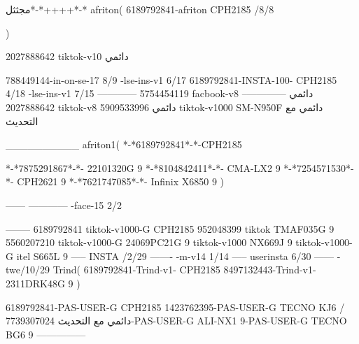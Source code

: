 مجثثل*-*++++*-*
afriton(
6189792841-afriton CPH2185  /8/8

)

2027888642 tiktok-v10
دائمي

788449144-in-on-se-17 8/9
-lse-ins-v1 6/17
6189792841-INSTA-100- CPH2185 4/18
-lse-ins-v1 7/15
------------
5754454119 facbook-v8
دائمي
--------------
2027888642 tiktok-v8
دائمي
5909533996 tiktok-v1000  SM-N950F
دائمي مع التحديث

__________
afriton1(
*-*6189792841*-*-CPH2185

*-*7875291867*-*- 22101320G   9\2
*-*8104842411*-*- CMA-LX2   9\4
*-*7254571530*-*- CPH2621   9\6
*-*7621747085*-*- Infinix X6850   9\6
)


------
------------
-face-15 2/2

--------
6189792841 tiktok-v1000-G CPH2185 
952048399 tiktok TMAF035G 9
5560207210 tiktok-v1000-G 24069PC21G  9 tiktok-v1000 NX669J  9 tiktok-v1000-G  itel S665L  9\3
-----
 INSTA /2/29
-------
-m-v14 1/14
-----
userinsta 6/30
------
-twe/10/29
Trind(
6189792841-Trind-v1- CPH2185 
8497132443-Trind-v1- 2311DRK48G  9\5
)


6189792841-PAS-USER-G CPH2185 
1423762395-PAS-USER-G TECNO KJ6  /دائمي مع التحديث
7739307024-PAS-USER-G  ALI-NX1  9-PAS-USER-G  TECNO BG6  9\8
    ---------------
